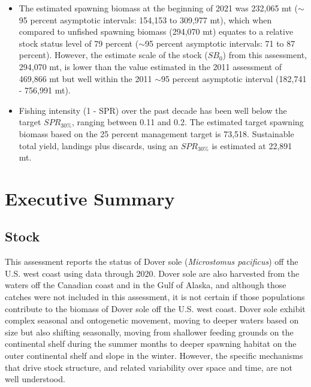 \documentclass[11pt,
  english,
  a4paper,
]{article}
\begin{document}
\begin{itemize}
\item The estimated spawning biomass at the beginning of 2021 was 232,065 mt ($\sim$95 percent asymptotic intervals: 154,153 to 309,977 mt), which when compared to unfished spawning biomass (294,070 mt) equates to a relative stock status level of 79 percent ($\sim$95 percent asymptotic intervals: 71 to 87 percent).  However, the estimate scale of the stock ($SB_0$) from this assessment, 294,070 mt, is lower than the value estimated in the 2011 assessment of 469,866 mt but well within the 2011 $\sim$95 percent asymptotic interval (182,741 - 756,991 mt).

\item  Fishing intensity (1 - SPR) over the past decade has been well below the target $SPR_{30\%}$, ranging between 0.11 and 0.2. The estimated target spawning biomass based on the 25 percent management target is 73,518. Sustainable total yield, landings plus discards, using an $SPR_{30\%}$ is estimated at 22,891 mt.   

\end{itemize}

\newpage


\hypertarget{executive-summary}{%
\section*{Executive Summary}\label{executive-summary}}

\leavevmode\tagmcend\tagstructend


\hypertarget{stock}{%
\subsection*{Stock}\label{stock}}

\leavevmode\tagmcend\tagstructend


This assessment reports the status of Dover sole (\emph{Microstomus pacificus}) off the U.S. west coast using data through 2020. Dover sole are also harvested from the waters off the Canadian coast and in the Gulf of Alaska, and although those catches were not included in this assessment, it is not certain if those populations contribute to the biomass of Dover sole off the U.S. west coast. Dover sole exhibit complex seasonal and ontogenetic movement, moving to deeper waters based on size but also shifting seasonally, moving from shallower feeding grounds on the continental shelf during the summer months to deeper spawning habitat on the outer continental shelf and slope in the winter. However, the specific mechanisms that drive stock structure, and related variability over space and time, are not well understood.
\end{document}
